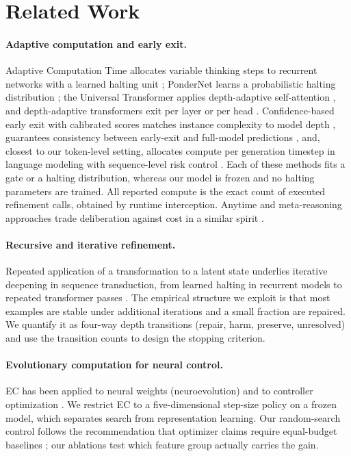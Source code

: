 ﻿\documentclass[11pt]{article}
\begin{document}
\section{Related Work}
\label{sec:related}

\paragraph{Adaptive computation and early exit.}
Adaptive Computation Time allocates variable thinking steps to recurrent networks with a learned halting unit \citep{graves2016adaptive}; PonderNet learns a probabilistic halting distribution \citep{banino2021ponder}; the Universal Transformer applies depth-adaptive self-attention \citep{dehghani2019universal}, and depth-adaptive transformers exit per layer or per head \citep{elbayad2020depth}. Confidence-based early exit with calibrated scores matches instance complexity to model depth \citep{schwartz2020right}, guarantees consistency between early-exit and full-model predictions \citep{schuster2021cats}, and, closest to our token-level setting, allocates compute per generation timestep in language modeling with sequence-level risk control \citep{schuster2022calm}. Each of these methods fits a gate or a halting distribution, whereas our model is frozen and no halting parameters are trained. All reported compute is the exact count of executed refinement calls, obtained by runtime interception. Anytime and meta-reasoning approaches trade deliberation against cost in a similar spirit \citep{zilberstein1996anytime}.

\paragraph{Recursive and iterative refinement.}
Repeated application of a transformation to a latent state underlies iterative deepening in sequence transduction, from learned halting in recurrent models \citep{graves2016adaptive} to repeated transformer passes \citep{dehghani2019universal}. The empirical structure we exploit is that most examples are stable under additional iterations and a small fraction are repaired. We quantify it as four-way depth transitions (repair, harm, preserve, unresolved) and use the transition counts to design the stopping criterion.

\paragraph{Evolutionary computation for neural control.}
EC has been applied to neural weights (neuroevolution) \citep{stanley2019designing} and to controller optimization \citep{eiben2015introduction}. We restrict EC to a five-dimensional step-size policy on a frozen model, which separates search from representation learning. Our random-search control follows the recommendation that optimizer claims require equal-budget baselines \citep{eiben2015introduction}; our ablations test which feature group actually carries the gain.
\end{document}
